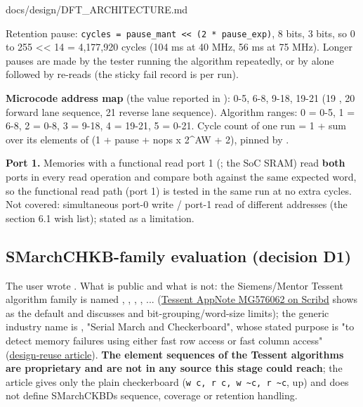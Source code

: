 \begin{relocated}{docs/design/DFT_ARCHITECTURE.md}
{}

Retention pause:
\texttt{cycles\ =\allowbreak{}\ pause\_\allowbreak{}mant\ <<\ (2\ *\ pause\_\allowbreak{}exp)},
 8 bits,  3 bits, so 0 to 255
\textless\textless{} 14 = 4,177,920 cycles (104 ms at 40 MHz, 56 ms at
75 MHz). Longer pauses are made by the tester running the algorithm
repeatedly, or by  alone followed by re-reads (the
sticky fail record is per run).

\textbf{Microcode address map} (the value reported in ):
 0-5,  6-8,  9-18, 
19-21 (19 , 20 forward lane sequence, 21 reverse lane
sequence). Algorithm ranges: 0 = 0-5, 1 = 6-8, 2 = 0-8, 3 = 9-18, 4 =
19-21, 5 = 0-21. Cycle count of one run = 1 + sum over its elements of
(1 + pause + nops x 2\^{}AW + 2), pinned by
.

\textbf{Port 1.} Memories with a functional read port 1 (;
the SoC SRAM) read \textbf{both} ports in every read operation and
compare both against the same expected word, so the functional read path
(port 1) is tested in the same run at no extra cycles. Not covered:
simultaneous port-0 write / port-1 read of different addresses (the
section 6.1 wish list); stated as a limitation.

\subsection{SMarchCHKB-family evaluation (decision D1)}\label{tm:ch:dft-architecture:163-smarchchkb-family-evaluation-decision-d1}

The user wrote . What is public and what is not: the
Siemens/\allowbreak{}Mentor Tessent algorithm family is named
, , ,
, ...
(\href{https://www.scribd.com/document/355278009/Tessent-AppNote-Memory-Shared-BUS}{Tessent
AppNote MG576062 on Scribd} shows  as the default
and discusses  and
bit-grouping/\allowbreak{}word-size limits); the generic industry name
is , "Serial March and Checkerboard", whose stated
purpose is "to detect memory failures using either fast row access or
fast column access"
(\href{https://www.design-reuse.com/articles/45915/memory-testing-self-repair-mechanism.html}{design-reuse
article}). \textbf{The element sequences of the Tessent algorithms are
proprietary and are not in any source this stage could reach}; the
article gives only the plain checkerboard
(\texttt{w\ c,\allowbreak{}\ r\ c,\allowbreak{}\ w\ \textasciitilde{}c,\allowbreak{}\ r\ \textasciitilde{}c},
up) and does not define SMarchCKBD\textquotesingle s sequence, coverage
or retention handling.


\end{relocated}
